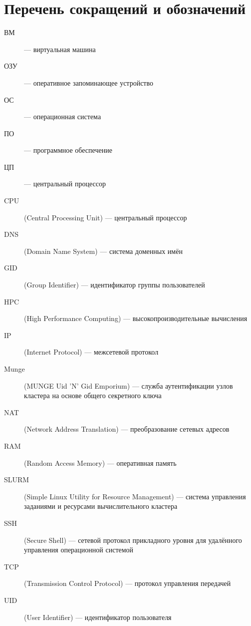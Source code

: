 \newpage
\section*{Перечень сокращений и обозначений}
\begin{description}
\item[ВМ] --- виртуальная машина
\item[ОЗУ] --- оперативное запоминающее устройство
\item[ОС] --- операционная система
\item[ПО] --- программное обеспечение
\item[ЦП] --- центральный процессор
\item[CPU] (Central Processing Unit) --- центральный процессор
\item[DNS] (Domain Name System) --- система доменных имён
\item[GID] (Group Identifier) --- идентификатор группы пользователей
\item[HPC] (High Performance Computing) --- высокопроизводительные вычисления
\item[IP] (Internet Protocol) --- межсетевой протокол
\item[Munge] (MUNGE Uid 'N' Gid Emporium) --- служба аутентификации узлов кластера на основе общего секретного ключа
\item[NAT] (Network Address Translation) --- преобразование сетевых адресов
\item[RAM] (Random Access Memory) --- оперативная память
\item[SLURM] (Simple Linux Utility for Resource Management) --- система управления заданиями и ресурсами вычислительного кластера
\item[SSH] (Secure Shell) --- сетевой протокол прикладного уровня для удалённого управления операционной системой
\item[TCP] (Transmission Control Protocol) --- протокол управления передачей
\item[UID] (User Identifier) --- идентификатор пользователя
\end{description}